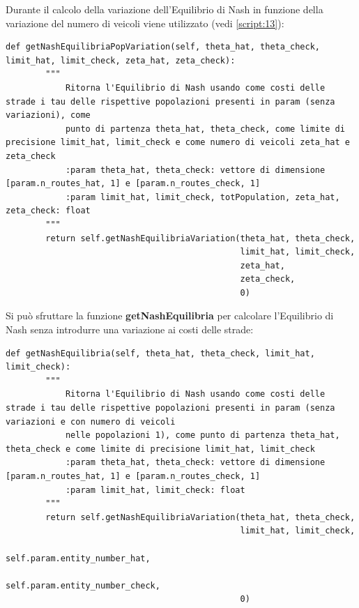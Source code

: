 Durante il calcolo della variazione dell'Equilibrio di Nash in funzione della variazione del numero di veicoli viene utilizzato (vedi \autoref{script:13}):
\begin{lstlisting}[style=myStile, caption={Computer::getNashEquilibriaCostVariation}, label={script:16}]
    def getNashEquilibriaPopVariation(self, theta_hat, theta_check, limit_hat, limit_check, zeta_hat, zeta_check):
        """
            Ritorna l'Equilibrio di Nash usando come costi delle strade i tau delle rispettive popolazioni presenti in param (senza variazioni), come
            punto di partenza theta_hat, theta_check, come limite di precisione limit_hat, limit_check e come numero di veicoli zeta_hat e zeta_check
            :param theta_hat, theta_check: vettore di dimensione [param.n_routes_hat, 1] e [param.n_routes_check, 1]
            :param limit_hat, limit_check, totPopulation, zeta_hat, zeta_check: float
        """
        return self.getNashEquilibriaVariation(theta_hat, theta_check,
                                               limit_hat, limit_check,
                                               zeta_hat,
                                               zeta_check,
                                               0)
\end{lstlisting}

Si può sfruttare la funzione \textbf{getNashEquilibria} per calcolare l'Equilibrio di Nash senza introdurre una variazione ai costi delle strade:

\begin{lstlisting}[style=myStile, caption={Computer::getNashEquilibria}, label={script:10}]
    def getNashEquilibria(self, theta_hat, theta_check, limit_hat, limit_check):
        """
            Ritorna l'Equilibrio di Nash usando come costi delle strade i tau delle rispettive popolazioni presenti in param (senza variazioni e con numero di veicoli
            nelle popolazioni 1), come punto di partenza theta_hat, theta_check e come limite di precisione limit_hat, limit_check
            :param theta_hat, theta_check: vettore di dimensione [param.n_routes_hat, 1] e [param.n_routes_check, 1]
            :param limit_hat, limit_check: float
        """
        return self.getNashEquilibriaVariation(theta_hat, theta_check, 
                                               limit_hat, limit_check, 
                                               self.param.entity_number_hat, 
                                               self.param.entity_number_check,
                                               0)
\end{lstlisting}

